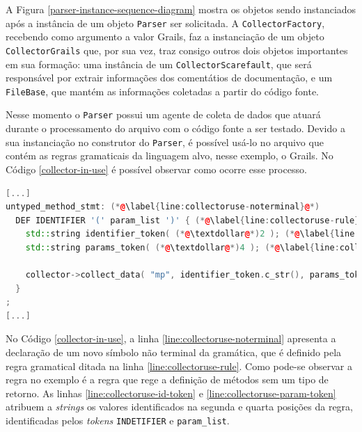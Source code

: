 A Figura \ref{parser-instance-sequence-diagram} mostra os objetos sendo
instanciados após a instância de um objeto \lstinline|Parser| ser solicitada.
A \lstinline|CollectorFactory|, recebendo como argumento a valor \textsf{Grails},
faz a instanciação de um objeto \lstinline|CollectorGrails| que, por sua vez,
traz consigo outros dois objetos importantes em sua formação: uma instância de um
\lstinline|CollectorScarefault|, que será responsável por extrair informações
dos comentátios de documentação, e um \lstinline|FileBase|, que mantém as informações
coletadas a partir do código fonte.

Nesse momento o \lstinline|Parser| possui um agente de coleta de dados que atuará durante
o processamento do arquivo com o código fonte a ser testado. Devido a sua instanciação
no construtor do \lstinline|Parser|, é possível usá-lo no arquivo que contém as regras
gramaticais da linguagem alvo, nesse exemplo, o \textsf{Grails}. No Código
\ref{collector-in-use} é possível observar como ocorre esse processo.

\begin{lstlisting}[language=C++, label=collector-in-use, caption=Agente coletor em uso no \parser]
[...]
untyped_method_stmt: (*@\label{line:collectoruse-noterminal}@*)
  DEF IDENTIFIER '(' param_list ')' { (*@\label{line:collectoruse-rule}@*)
    std::string identifier_token( (*@\textdollar@*)2 ); (*@\label{line:collectoruse-id-token}@*)
    std::string params_token( (*@\textdollar@*)4 ); (*@\label{line:collectoruse-param-token}@*)

    collector->collect_data( "mp", identifier_token.c_str(), params_token.c_str() ); (*@\label{line:collectoruse-collect-data}@*)
  }
;
[...]
\end{lstlisting}

No Código \ref{collector-in-use}, a linha \ref{line:collectoruse-noterminal}
apresenta a declaração de um novo símbolo não terminal da gramática, que é
definido pela regra gramatical ditada na linha \ref{line:collectoruse-rule}.
Como pode-se observar a regra no exemplo é a regra que rege a definição de
métodos sem um tipo de retorno. As linhas \ref{line:collectoruse-id-token} e
\ref{line:collectoruse-param-token} atribuem a \textit{strings} os valores
identificados na segunda e quarta posições da regra, identificadas pelos
\textit{tokens} \lstinline|INDETIFIER| e \lstinline|param_list|.

